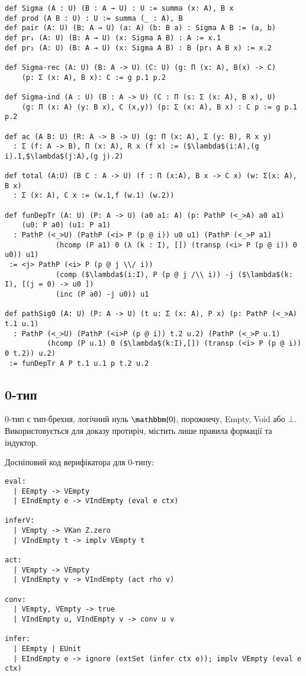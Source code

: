 \begin{lstlisting}
def Sigma (A : U) (B : A → U) : U := summa (x: A), B x
def prod (A B : U) : U := summa (_ : A), B
def pair (A: U) (B: A → U) (a: A) (b: B a) : Sigma A B := (a, b)
def pr₁ (A: U) (B: A → U) (x: Sigma A B) : A := x.1
def pr₂ (A: U) (B: A → U) (x: Sigma A B) : B (pr₁ A B x) := x.2

def Sigma-rec (A: U) (B: A -> U) (C: U) (g: Π (x: A), B(x) -> C)
    (p: Σ (x: A), B x): C := g p.1 p.2

def Sigma-ind (A : U) (B : A -> U) (C : Π (s: Σ (x: A), B x), U) 
    (g: Π (x: A) (y: B x), C (x,y)) (p: Σ (x: A), B x) : C p := g p.1 p.2

def ac (A B: U) (R: A -> B -> U) (g: Π (x: A), Σ (y: B), R x y)
  : Σ (f: A -> B), Π (x: A), R x (f x) := ($\lambda$(i:A),(g i).1,$\lambda$(j:A),(g j).2)

def total (A:U) (B C : A -> U) (f : Π (x:A), B x -> C x) (w: Σ(x: A), B x)
  : Σ (x: A), C x := (w.1,f (w.1) (w.2))

def funDepTr (A: U) (P: A -> U) (a0 a1: A) (p: PathP (<_>A) a0 a1)
    (u0: P a0) (u1: P a1)
  : PathP (<_>U) (PathP (<i> P (p @ i)) u0 u1) (PathP (<_>P a1)
            (hcomp (P a1) 0 (λ (k : I), []) (transp (<i> P (p @ i)) 0 u0)) u1)
 := <j> PathP (<i> P (p @ j \\/ i))
            (comp ($\lambda$(i:I), P (p @ j /\\ i)) -j ($\lambda$(k: I), [(j = 0) -> u0 ])
            (inc (P a0) -j u0)) u1

def pathSig0 (A: U) (P: A -> U) (t u: Σ (x: A), P x) (p: PathP (<_>A) t.1 u.1)
  : PathP (<_>U) (PathP (<i>P (p @ i)) t.2 u.2) (PathP (<_>P u.1)
          (hcomp (P u.1) 0 ($\lambda$(k:I),[]) (transp (<i> P (p @ i)) 0 t.2)) u.2)
 := funDepTr A P t.1 u.1 p t.2 u.2
\end{lstlisting}

\newpage
\subsection*{0-тип}

0-тип є тип-брехня, логічний нуль $\mathbbm{0}$, порожнечу, Empty, Void або $\bot$.
Використовується для доказу протиріч, містить лише правила формації та індуктор.

Досніповий код верифікатора для 0-типу:
\begin{lstlisting}
eval:
  | EEmpty -> VEmpty
  | EIndEmpty e -> VIndEmpty (eval e ctx)

inferV:
  | VEmpty -> VKan Z.zero
  | VIndEmpty t -> implv VEmpty t

act:
  | VEmpty -> VEmpty
  | VIndEmpty v -> VIndEmpty (act rho v)

conv:
  | VEmpty, VEmpty -> true
  | VIndEmpty u, VIndEmpty v -> conv u v

infer:
  | EEmpty | EUnit
  | EIndEmpty e -> ignore (extSet (infer ctx e)); implv VEmpty (eval e ctx)
\end{lstlisting}

